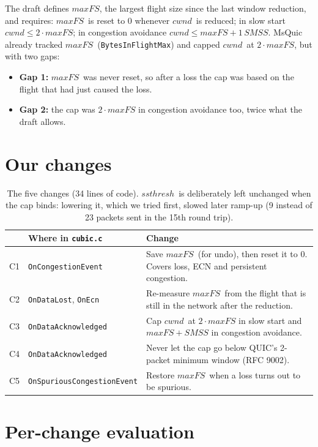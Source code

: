 \documentclass[11pt,a4paper]{article}
\newcommand{\maxfs}{\ensuremath{\mathit{maxFS}}}
\newcommand{\cwnd}{\ensuremath{\mathit{cwnd}}}
\newcommand{\ssthresh}{\ensuremath{\mathit{ssthresh}}}
\newcommand{\smss}{\ensuremath{\mathit{SMSS}}}
\begin{document}
The draft defines \maxfs, the largest flight size since the last window
reduction, and requires: \maxfs\ is reset to 0 whenever \cwnd\ is reduced;
in slow start $\cwnd \le 2\cdot\maxfs$; in congestion avoidance
$\cwnd \le \maxfs + 1\,\smss$. MsQuic already tracked \maxfs\
(\texttt{BytesInFlightMax}) and capped \cwnd\ at $2\cdot\maxfs$, but with two
gaps:
\begin{itemize}
  \item \textbf{Gap 1:} \maxfs\ was never reset, so after a loss the cap was
        based on the flight that had just caused the loss.
  \item \textbf{Gap 2:} the cap was $2\cdot\maxfs$ in congestion avoidance too,
        twice what the draft allows.
\end{itemize}

\section{Our changes}

\begin{table}[H]
\centering\small
\begin{tabularx}{\textwidth}{@{}l l X@{}}
\toprule
 & Where in \texttt{cubic.c} & Change \\
\midrule
C1 & \texttt{OnCongestionEvent} & Save \maxfs\ (for undo), then reset it to 0. Covers loss, ECN and persistent congestion. \\
C2 & \texttt{OnDataLost}, \texttt{OnEcn} & Re-measure \maxfs\ from the flight that is still in the network after the reduction. \\
C3 & \texttt{OnDataAcknowledged} & Cap \cwnd\ at $2\cdot\maxfs$ in slow start and $\maxfs + \smss$ in congestion avoidance. \\
C4 & \texttt{OnDataAcknowledged} & Never let the cap go below QUIC's 2-packet minimum window (RFC 9002). \\
C5 & \texttt{OnSpuriousCongestionEvent} & Restore \maxfs\ when a loss turns out to be spurious. \\
\bottomrule
\end{tabularx}
\caption{The five changes (34 lines of code). \ssthresh\ is deliberately left
  unchanged when the cap binds: lowering it, which we tried first, slowed later
  ramp-up (9 instead of 23 packets sent in the 15th round trip).}
\label{tab:changes}
\end{table}

\section{Per-change evaluation}
\end{document}
